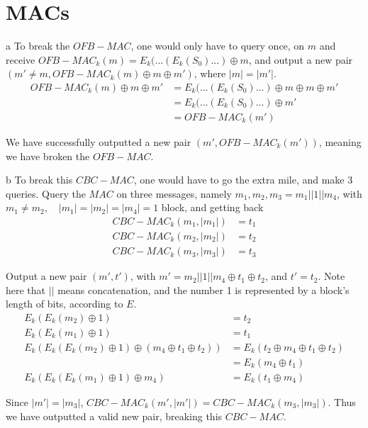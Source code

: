 \documentclass{article}
\begin{document}
\section{MACs}
\begin{paragraph}
	a To break the $OFB-MAC$, one would only have to query once, on $m$ and receive $OFB-MAC_k(m) = E_k(...(E_k(S_0)...) \oplus m$, and output a new pair $(m' \neq m, OFB-MAC_k(m) \oplus m \oplus m')$, where $|m| = |m'|$.
	\begin{align*}
	    OFB-MAC_k(m) \oplus m \oplus m' &= E_k(...(E_k(S_0)...) \oplus m \oplus m \oplus m'\\
	    &= E_k(...(E_k(S_0)...) \oplus m'\\
	    &= OFB-MAC_k(m')
	\end{align*}
	
	We have successfully outputted a new pair $(m', OFB-MAC_k(m'))$, meaning we have broken the $OFB-MAC$.
\end{paragraph}

\begin{paragraph}
    b To break this $CBC-MAC$, one would have to go the extra mile, and make 3 queries. Query the $MAC$ on three messages, namely $m_1, m_2, m_3 = m_1 || 1 || m_4$, with $m_1 \neq m_2, \quad |m_1| = |m_2| = |m_4| = 1$ block, and getting back
    \begin{align*}
        CBC-MAC_k(m_1, |m_1|) &= t_1\\
        CBC-MAC_k(m_2, |m_2|) &= t_2\\
        CBC-MAC_k(m_3, |m_3|) &= t_3
    \end{align*}
    
    Output a new pair $(m', t')$, with $m' = m_2 || 1 || m_4 \oplus t_1 \oplus t_2$, and $t' = t_2$. Note here that $||$ means concatenation, and the number 1 is represented by a block's length of bits, according to $E$.
    \begin{align*}
        E_k(E_k(m_2) \oplus 1) &= t_2\\
        E_k(E_k(m_1) \oplus 1) &= t_1\\
        E_k(E_k(E_k(m_2) \oplus 1) \oplus (m_4 \oplus t_1 \oplus t_2)) &= E_k(t_2 \oplus m_4 \oplus t_1 \oplus t_2)\\
        &= E_k(m_4 \oplus t_1)\\
        E_k(E_k(E_k(m_1) \oplus 1) \oplus m_4) &= E_k(t_1 \oplus m_4)
    \end{align*}
    
    Since $|m'| = |m_3|$, $CBC-MAC_k(m', |m'|) = CBC-MAC_k(m_3, |m_3|)$. Thus we have outputted a valid new pair, breaking this $CBC-MAC$.
\end{paragraph}
\end{document}
